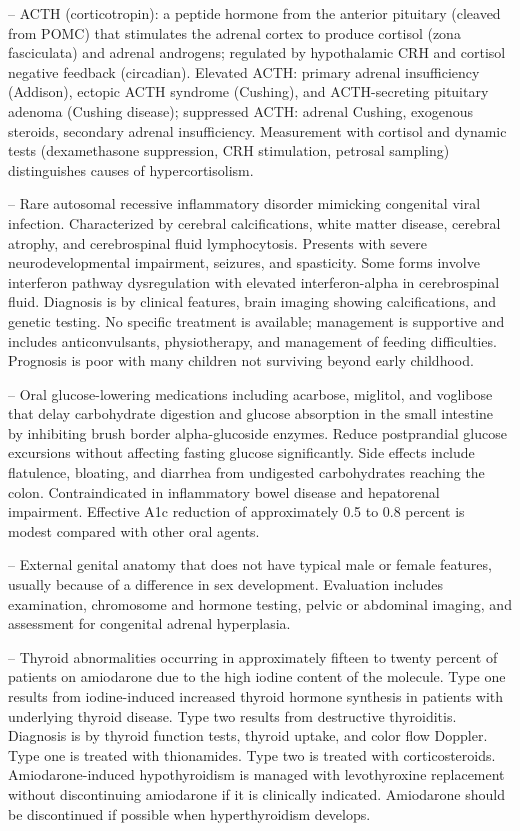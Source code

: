 -- ACTH (corticotropin): a peptide hormone from the anterior pituitary (cleaved from POMC) that stimulates the adrenal cortex to produce cortisol (zona fasciculata) and adrenal androgens; regulated by hypothalamic CRH and cortisol negative feedback (circadian). Elevated ACTH: primary adrenal insufficiency (Addison), ectopic ACTH syndrome (Cushing), and ACTH-secreting pituitary adenoma (Cushing disease); suppressed ACTH: adrenal Cushing, exogenous steroids, secondary adrenal insufficiency. Measurement with cortisol and dynamic tests (dexamethasone suppression, CRH stimulation, petrosal sampling) distinguishes causes of hypercortisolism.

-- Rare autosomal recessive inflammatory disorder mimicking congenital viral infection. Characterized by cerebral calcifications, white matter disease, cerebral atrophy, and cerebrospinal fluid lymphocytosis. Presents with severe neurodevelopmental impairment, seizures, and spasticity. Some forms involve interferon pathway dysregulation with elevated interferon-alpha in cerebrospinal fluid. Diagnosis is by clinical features, brain imaging showing calcifications, and genetic testing. No specific treatment is available; management is supportive and includes anticonvulsants, physiotherapy, and management of feeding difficulties. Prognosis is poor with many children not surviving beyond early childhood.

-- Oral glucose-lowering medications including acarbose, miglitol, and voglibose that delay carbohydrate digestion and glucose absorption in the small intestine by inhibiting brush border alpha-glucoside enzymes. Reduce postprandial glucose excursions without affecting fasting glucose significantly. Side effects include flatulence, bloating, and diarrhea from undigested carbohydrates reaching the colon. Contraindicated in inflammatory bowel disease and hepatorenal impairment. Effective A1c reduction of approximately 0.5 to 0.8 percent is modest compared with other oral agents.

-- External genital anatomy that does not have typical male or female features, usually because of a difference in sex development. Evaluation includes examination, chromosome and hormone testing, pelvic or abdominal imaging, and assessment for congenital adrenal hyperplasia.

-- Thyroid abnormalities occurring in approximately fifteen to twenty percent of patients on amiodarone due to the high iodine content of the molecule. Type one results from iodine-induced increased thyroid hormone synthesis in patients with underlying thyroid disease. Type two results from destructive thyroiditis. Diagnosis is by thyroid function tests, thyroid uptake, and color flow Doppler. Type one is treated with thionamides. Type two is treated with corticosteroids. Amiodarone-induced hypothyroidism is managed with levothyroxine replacement without discontinuing amiodarone if it is clinically indicated. Amiodarone should be discontinued if possible when hyperthyroidism develops.

